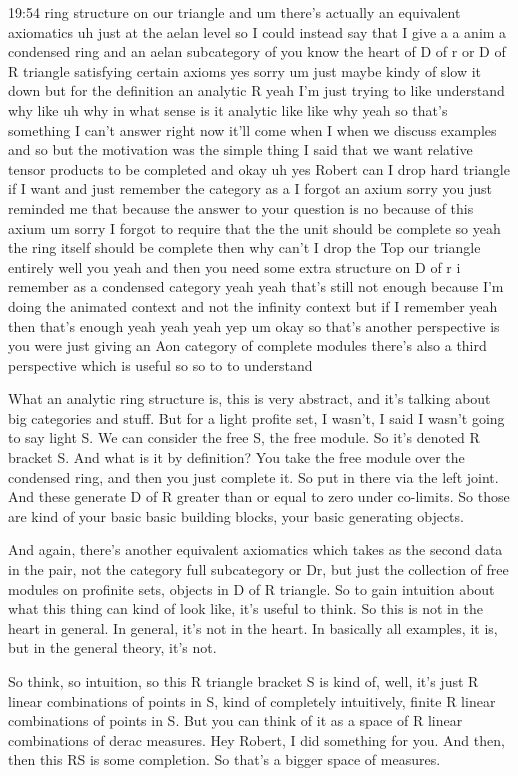 \begin{unfinished}{19:54}
ring structure on our triangle and um there's actually an equivalent axiomatics uh just at the aelan level so I could instead say that I give a a anim a condensed ring and an aelan subcategory of you know the heart of D of r or D of R triangle satisfying certain axioms yes sorry um just maybe kindy of slow it down but for the definition an analytic R yeah I'm just trying to like understand why like uh why in what sense is it analytic like like why yeah so that's something I can't answer right now it'll come when I when we discuss examples and so but the motivation was the simple thing I said that we want relative tensor products to be completed and okay uh yes Robert can I drop hard triangle if I want and just remember the category as a I forgot an axium sorry you just reminded me that because the answer to your question is no because of this axium um sorry I forgot to require that the the unit should be complete so yeah the ring itself should be complete then why can't I drop the Top our triangle entirely well you yeah and then you need some extra structure on D of r i remember as a condensed category yeah yeah that's still not enough because I'm doing the animated context and not the infinity context but if I remember yeah then that's enough yeah yeah yeah yep um okay so that's another perspective is you were just giving an Aon category of complete modules there's also a third perspective which is useful so so to to understand

What an analytic ring structure is, this is very abstract, and it's talking about big categories and stuff. But for a light profite set, I wasn't, I said I wasn't going to say light S. We can consider the free S, the free module. So it's denoted R bracket S. And what is it by definition? You take the free module over the condensed ring, and then you just complete it. So put in there via the left joint. And these generate D of R greater than or equal to zero under co-limits. So those are kind of your basic basic building blocks, your basic generating objects. 

And again, there's another equivalent axiomatics which takes as the second data in the pair, not the category full subcategory or Dr, but just the collection of free modules on profinite sets, objects in D of R triangle. So to gain intuition about what this thing can kind of look like, it's useful to think. So this is not in the heart in general. In general, it's not in the heart. In basically all examples, it is, but in the general theory, it's not. 

So think, so intuition, so this R triangle bracket S is kind of, well, it's just R linear combinations of points in S, kind of completely intuitively, finite R linear combinations of points in S. But you can think of it as a space of R linear combinations of derac measures. Hey Robert, I did something for you. And then, then this RS is some completion. So that's a bigger space of measures. 


\end{unfinished}
